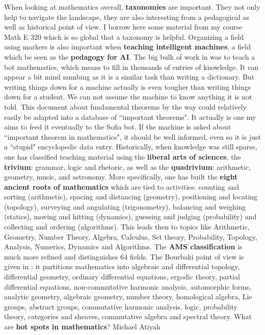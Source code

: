 \documentclass[12pt]{amsart}
\begin{document}
When looking at mathematics overall, {\bf taxonomies} are important. They not only help to navigate the
landscape, they are also interesting from a pedagogical as well as historical point of view. I borrow here
some material from my course Math E 320 which is so global that a taxonomy is helpful. Organizing a field
using markers is also important when {\bf teaching intelligent machines}, a field which be seen as the 
{\bf pedagogy for AI}. The big bulk of work in \cite{AIEducation} was to teach a bot mathematics, which 
means to fill in thousands of entries of knowledge. It can appear a bit mind numbing as it is a similar task than
writing a dictionary. But writing things down for a machine actually is even tougher than writing things
down for a student. We can not assume the machine to know anything it is not told. This document about
fundamental theorems by the way could relatively easily be adapted into a database of ``important theorems". 
It actually is one my aims to feed it eventually to the Sofia bot. If the machine is asked about
``important theorem in mathematics", it should be well informed, even so it is just a ``stupid"
encyclopedic data entry. Historically, when knowledge was still sparse, one has
classified teaching material using the {\bf liberal arts of sciences}, the 
{\bf trivium}: grammar, logic and rhetoric, as well as the {\bf quadrivium}: 
arithmetic, geometry, music, and astronomy. More specifically, one has built the {\bf eight ancient roots of 
mathematics} which are tied to activities: counting and sorting (arithmetic),
spacing and distancing  (geometry), positioning and locating  (topology),
surveying and angulating  (trigonometry), balancing and weighing (statics),
moving and hitting  (dynamics), guessing and judging (probability) and
collecting and ordering (algorithms). This leads then to topics like
Arithmetic, Geometry, Number Theory, Algebra, Calculus, Set theory, Probability, Topology, Analysis, 
Numerics, Dynamics and Algorithms. The {\bf AMS classification} is much more refined and distinguishes
64 fields. The Bourbaki point of view is given in \cite{DieudonnePanorama}: it partitions mathematics into
algebraic and differential topology, differential geometry, ordinary differential equations, ergodic theory, 
partial differential equations, non-commutative harmonic analysis, automorphic forms, 
analytic geometry, algebraic geometry, number theory, homological algebra, Lie groups, abstract groups, 
commutative harmonic analysis, logic, probability theory, categories and sheaves, commutative algebra 
and spectral theory. What are {\bf hot spots in mathematics}? Michael Atiyah \cite{atiyah2000}
\end{document}
